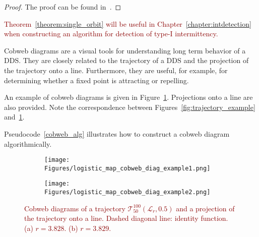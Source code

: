 \begin{proof}
    The proof can be found in~\cite[p.~74]{Devaney20211026}.
\end{proof}

\begin{remark}
\textcolor{darkred}{
Theorem~\ref{theorem:single_orbit} will be useful in Chapter~\ref{chapter:intdetection} when constructing an algorithm for detection of type-I intermittency.
}
\end{remark}

\begin{remark}
\label{def:cobweb}
    Cobweb diagrams are a visual tools for understanding long term behavior of a DDS.
    They are closely related to the trajectory of a DDS and the projection of the trajectory onto a line.
    Furthermore, they are useful, for example, for determining whether a fixed point is attracting or repelling.
    \par
    An example of cobweb diagrams is given in Figure~\ref{fig:cobweb_diag_example}.
    Projections onto a line are also provided.
    Note the correspondence between Figures~\ref{fig:trajectory_example} and~\ref{fig:cobweb_diag_example}.
    \par
    Pseudocode~\ref{cobweb_alg} illustrates how to construct a cobweb diagram algorithmically.
\end{remark}

\begin{figure}[!h]
    \centering
    \begin{subfigure}{0.6\textwidth}
        \centering
        \texttt{[image: Figures/logistic\_map\_cobweb\_diag\_example1.png]}
        \caption{}
    \end{subfigure}
    \hfill
    \begin{subfigure}{0.6\textwidth}
        \centering
        \texttt{[image: Figures/logistic\_map\_cobweb\_diag\_example2.png]}
        \caption{}
    \end{subfigure}

    \caption{
        \textcolor{darkred}{
        Cobweb diagrams of a trajectory $\mathcal{T}_{50}^{100}(\mathcal{L}_{r}, 0.5)$ and a projection of the trajectory onto a line. 
        Dashed diagonal line: identity function. 
        (a) $r = 3.828$. 
        (b) $r = 3.829$. 
        }
        }
    \label{fig:cobweb_diag_example}
\end{figure}

